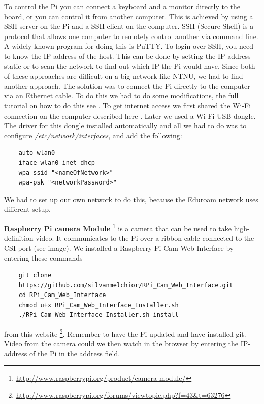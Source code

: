 To control the Pi you can connect a keyboard and a monitor directly to the board, or you can control it from another computer. 
This is achieved by using a SSH server on the Pi and a SSH client on the computer. 
SSH (Secure Shell) is a protocol that allows one computer to remotely control another via command line. A widely known program for doing this is PuTTY. To login over SSH, you need to know the IP-address of the host. This can be done by setting the IP-address static or to scan the network to find out which IP the Pi would have. Since both of these approaches are difficult on a big network like NTNU, we had to find another approach. The solution was to connect the Pi directly to the computer via an Ethernet cable. To do this we had to do some modifications, the full tutorial on how to do this see \citep{direct-Pi}. To get internet access we first shared the Wi-Fi connection on the computer described here \cite{network-Pi}. Later we used a Wi-Fi USB dongle. The driver for this dongle installed automatically and all we had to do was to configure \textit{/etc/network/interfaces}, and add the following:
\begin{verbatim}
    auto wlan0
    iface wlan0 inet dhcp
    wpa-ssid "<nameOfNetwork>"
    wpa-psk "<networkPassword>"
\end{verbatim}
We had to set up our own network to do this, because the Eduroam network uses different setup.
\bigskip

\textbf{Raspberry Pi camera Module} \footnote{\url{http://www.raspberrypi.org/product/camera-module/}}
is a camera that can be used to take high-definition video. It communicates to the Pi over a ribbon cable connected to the CSI port (see image). We installed a Raspberry Pi Cam Web Interface by entering these commands
\begin{verbatim}
    git clone
    https://github.com/silvanmelchior/RPi_Cam_Web_Interface.git
    cd RPi_Cam_Web_Interface
    chmod u+x RPi_Cam_Web_Interface_Installer.sh
    ./RPi_Cam_Web_Interface_Installer.sh install
\end{verbatim}
from this website \footnote{\url{http://www.raspberrypi.org/forums/viewtopic.php?f=43&t=63276}}.
Remember to have the Pi updated and have installed git.
Video from the camera could we then watch in the browser by entering the IP-address of the Pi in the address field.
\bigskip

